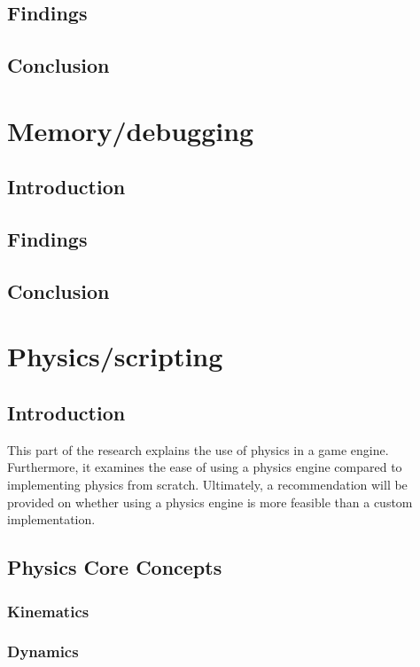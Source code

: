 \documentclass{projdoc}
\begin{document}
\subsection{Findings}

\subsection{Conclusion}

\section{Memory/debugging}

\subsection{Introduction}

\subsection{Findings}

\subsection{Conclusion}

\section{Physics/scripting}

\subsection{Introduction}
This part of the research explains the use of physics in a game engine. Furthermore, it examines the ease of using a physics engine compared to implementing physics from scratch. Ultimately, a recommendation will be provided on whether using a physics engine is more feasible than a custom implementation.

\subsection{Physics Core Concepts}

\subsubsection{Kinematics}

\subsubsection{Dynamics}
\end{document}
